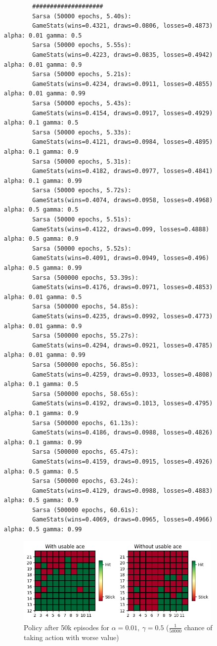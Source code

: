 \documentclass{article}
\begin{document}
    \begin{verbatim}
        ####################
        Sarsa (50000 epochs, 5.40s):
        GameStats(wins=0.4321, draws=0.0806, losses=0.4873)        alpha: 0.01 gamma: 0.5
        Sarsa (50000 epochs, 5.55s):
        GameStats(wins=0.4223, draws=0.0835, losses=0.4942)        alpha: 0.01 gamma: 0.9
        Sarsa (50000 epochs, 5.21s):
        GameStats(wins=0.4234, draws=0.0911, losses=0.4855)        alpha: 0.01 gamma: 0.99
        Sarsa (50000 epochs, 5.43s):
        GameStats(wins=0.4154, draws=0.0917, losses=0.4929)        alpha: 0.1 gamma: 0.5
        Sarsa (50000 epochs, 5.33s):
        GameStats(wins=0.4121, draws=0.0984, losses=0.4895)        alpha: 0.1 gamma: 0.9
        Sarsa (50000 epochs, 5.31s):
        GameStats(wins=0.4182, draws=0.0977, losses=0.4841)        alpha: 0.1 gamma: 0.99
        Sarsa (50000 epochs, 5.72s):
        GameStats(wins=0.4074, draws=0.0958, losses=0.4968)        alpha: 0.5 gamma: 0.5
        Sarsa (50000 epochs, 5.51s):
        GameStats(wins=0.4122, draws=0.099, losses=0.4888)        alpha: 0.5 gamma: 0.9
        Sarsa (50000 epochs, 5.52s):
        GameStats(wins=0.4091, draws=0.0949, losses=0.496)        alpha: 0.5 gamma: 0.99
        Sarsa (500000 epochs, 53.39s):
        GameStats(wins=0.4176, draws=0.0971, losses=0.4853)        alpha: 0.01 gamma: 0.5
        Sarsa (500000 epochs, 54.85s):
        GameStats(wins=0.4235, draws=0.0992, losses=0.4773)        alpha: 0.01 gamma: 0.9
        Sarsa (500000 epochs, 55.27s):
        GameStats(wins=0.4294, draws=0.0921, losses=0.4785)        alpha: 0.01 gamma: 0.99
        Sarsa (500000 epochs, 56.85s):
        GameStats(wins=0.4259, draws=0.0933, losses=0.4808)        alpha: 0.1 gamma: 0.5
        Sarsa (500000 epochs, 58.65s):
        GameStats(wins=0.4192, draws=0.1013, losses=0.4795)        alpha: 0.1 gamma: 0.9
        Sarsa (500000 epochs, 61.13s):
        GameStats(wins=0.4186, draws=0.0988, losses=0.4826)        alpha: 0.1 gamma: 0.99
        Sarsa (500000 epochs, 65.47s):
        GameStats(wins=0.4159, draws=0.0915, losses=0.4926)        alpha: 0.5 gamma: 0.5
        Sarsa (500000 epochs, 63.24s):
        GameStats(wins=0.4129, draws=0.0988, losses=0.4883)        alpha: 0.5 gamma: 0.9
        Sarsa (500000 epochs, 60.61s):
        GameStats(wins=0.4069, draws=0.0965, losses=0.4966)        alpha: 0.5 gamma: 0.99
    \end{verbatim}

    \begin{figure}[h]
        \centering
        \includegraphics[width=10cm]{plots/sarsa_policy_50k.png}
        \caption{Policy after 50k episodes for $\alpha=0.01,\ \gamma=0.5$ ($\frac{1}{50000}$ chance of taking action with worse value)}
    \end{figure}
\end{document}
